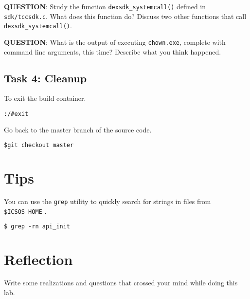 \documentclass[a4paper, 11pt,oneside]{article}
\begin{document}
\textbf{QUESTION}: Study the function \texttt{dexsdk\_systemcall()} defined in 
\texttt{sdk/tccsdk.c}. What does this function do? Discuss two other functions 
that call \texttt{dexsdk\_systemcall()}. \newline 

\textbf{QUESTION}: What is the output of executing \texttt{chown.exe}, complete with command line arguments, this time? Describe what you think happened.


\subsection*{Task 4: Cleanup}
To exit the build container. 
\begin{verbatim}
:/#exit
\end{verbatim}

Go back to the master branch of the source code.
\begin{verbatim}
$git checkout master
\end{verbatim}



\section{Tips}
You can use the \texttt{grep} utility to quickly search for strings in files from \texttt{\$ICSOS\_HOME} .
\begin{verbatim}
$ grep -rn api_init
\end{verbatim}
 
\section{Reflection}
Write some realizations and questions that crossed your mind while doing this 
lab. 
\end{document}
